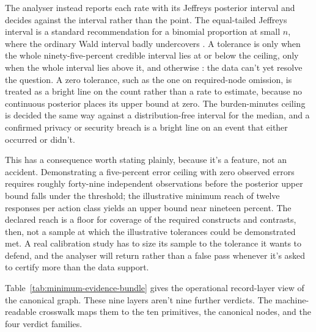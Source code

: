The analyser instead reports each rate with its Jeffreys posterior interval and decides against the interval rather than the point. The equal-tailed Jeffreys interval is a standard recommendation for a binomial proportion at small \(n\), where the ordinary Wald interval badly undercovers \citep{brownCaiDasGupta2001interval}. A tolerance is  only when the whole ninety-five-percent credible interval lies at or below the ceiling,  only when the whole interval lies above it, and otherwise : the data can't yet resolve the question. A zero tolerance, such as the one on required-node omission, is treated as a bright line on the count rather than a rate to estimate, because no continuous posterior places its upper bound at zero. The burden-minutes ceiling is decided the same way against a distribution-free interval for the median, and a confirmed privacy or security breach is a bright line on an event that either occurred or didn't.

This has a consequence worth stating plainly, because it's a feature, not an accident. Demonstrating a five-percent error ceiling with zero observed errors requires roughly forty-nine independent observations before the posterior upper bound falls under the threshold; the illustrative minimum reach of twelve responses per action class yields an upper bound near nineteen percent. The declared reach is a floor for coverage of the required constructs and contrasts, then, not a sample at which the illustrative tolerances could be demonstrated met. A real calibration study has to size its sample to the tolerance it wants to defend, and the analyser will return  rather than a false pass whenever it's asked to certify more than the data support.

Table~\ref{tab:minimum-evidence-bundle} gives the operational record-layer view of the canonical graph. These nine layers aren't nine further verdicts. The machine-readable crosswalk maps them to the ten primitives, the canonical nodes, and the four verdict families.

